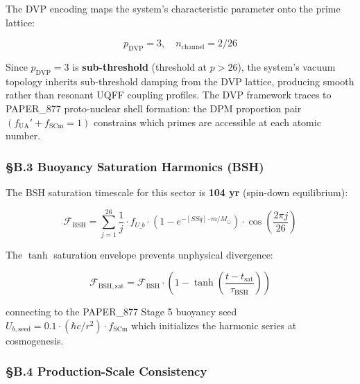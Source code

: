 \documentclass[
  11pt,
]{article}
\begin{document}
The DVP encoding maps the system's characteristic parameter onto the
prime lattice:

\[p_{\mathrm{DVP}} = 3, \quad n_{\mathrm{channel}} = 2/26\]

Since $p_{\mathrm{DVP}} = 3$ is \textbf{sub-threshold} (threshold at
$p > 26$), the system's vacuum topology inherits sub-threshold damping
from the DVP lattice, producing smooth rather than resonant UQFF
coupling profiles. The DVP framework traces to PAPER\_877 proto-nuclear
shell formation: the DPM proportion pair
$(f_{\mathrm{UA}}' + f_{\mathrm{SCm}} = 1)$ constrains which primes
are accessible at each atomic number.

\subsubsection{§B.3 Buoyancy Saturation Harmonics
(BSH)}\label{b.3-buoyancy-saturation-harmonics-bsh}

The BSH saturation timescale for this sector is \textbf{104 yr}
(spin-down equilibrium):

\[\mathcal{F}_{\mathrm{BSH}} = \sum_{j=1}^{26} \frac{1}{j} \cdot f_{U\_b} \cdot \left(1 - e^{-[SSq] \cdot m/M_\odot}\right) \cdot \cos\!\left(\frac{2\pi j}{26}\right)\]

The $\tanh$ saturation envelope prevents unphysical divergence:

\[\mathcal{F}_{\mathrm{BSH,sat}} = \mathcal{F}_{\mathrm{BSH}} \cdot \left(1 - \tanh\!\left(\frac{t - t_{\mathrm{sat}}}{\tau_{\mathrm{BSH}}}\right)\right)\]

connecting to the PAPER\_877 Stage 5 buoyancy seed
$U_{b,\mathrm{seed}} = 0.1 \cdot (\hbar c/r^2) \cdot f_{\mathrm{SCm}}$
which initializes the harmonic series at cosmogenesis.

\subsubsection{§B.4 Production-Scale
Consistency}\label{b.4-production-scale-consistency}
\end{document}
